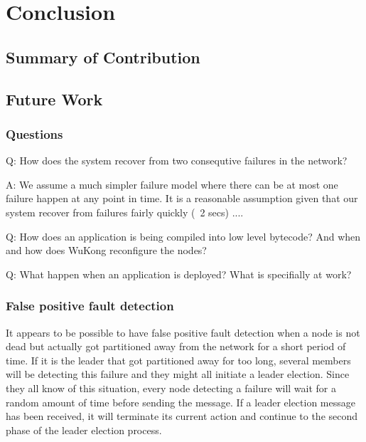 \chapter{Conclusion}
\label{c:conclusion}

\section{Summary of Contribution}

\section{Future Work}


\subsection{Questions}

Q: How does the system recover from two consequtive failures in the network?

A: We assume a much simpler failure model where there can be at most one
failure happen at any point in time. It is a reasonable assumption given that
our system recover from failures fairly quickly (~2 secs) ....


Q: How does an application is being compiled into low level bytecode? And when
and how does WuKong reconfigure the nodes?


Q: What happen when an application is deployed? What is specifially at work?

\subsection{False positive fault detection}

It appears to be possible to have false positive fault detection when a node is not dead but actually got partitioned away from the network for a short period of time. If it is the leader that got partitioned away for too long, several members will be detecting this failure and they might all initiate a leader election. Since they all know of this situation, every node detecting a failure will wait for a random amount of time before sending the message. If a leader election message has been received, it will terminate its current action and continue to the second phase of the leader election process.


